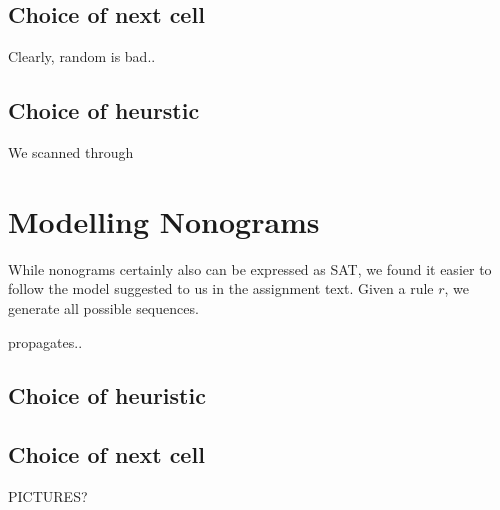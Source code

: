 \documentclass[journal]{IEEEtran}
\begin{document}
\subsection{Choice of next cell}
Clearly, random is bad..

\subsection{Choice of heurstic}
We scanned through 


\section*{Modelling Nonograms}
While nonograms certainly also can be expressed as SAT, we found it easier to
follow the model suggested to us in the assignment text. Given a rule
$r$, we generate all possible sequences.

propagates..

\subsection{Choice of heuristic}

\subsection{Choice of next cell}

PICTURES?
\end{document}
